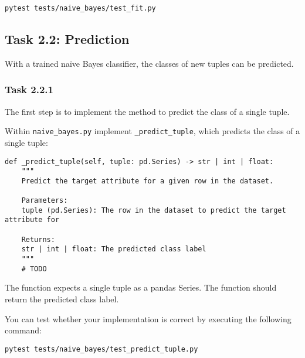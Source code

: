 \documentclass[
english,
smallborders
]{i6prcsht}
\begin{document}
\vspace*{0.3cm}

\begin{lstlisting}
pytest tests/naive_bayes/test_fit.py
\end{lstlisting}

\vspace*{0.1cm}

\subsection*{Task 2.2: Prediction}

With a trained naïve Bayes classifier, the classes of new tuples can be predicted.

\subsubsection*{Task 2.2.1}

The first step is to implement the method to predict the class of a single tuple.

Within \texttt{naive\_bayes.py} implement \texttt{\_predict\_tuple}, which predicts the class of a single tuple:

\vspace*{0.3cm}

\begin{lstlisting}
def _predict_tuple(self, tuple: pd.Series) -> str | int | float:
	"""
	Predict the target attribute for a given row in the dataset.

	Parameters:
	tuple (pd.Series): The row in the dataset to predict the target attribute for

	Returns:
	str | int | float: The predicted class label
	"""
	# TODO
\end{lstlisting}

\vspace*{0.1cm}

The function expects a single tuple as a pandas Series. The function should return the predicted class label.

You can test whether your implementation is correct by executing the following command:

\vspace*{0.3cm}

\begin{lstlisting}
pytest tests/naive_bayes/test_predict_tuple.py
\end{lstlisting}

\vspace*{0.1cm}
\end{document}
